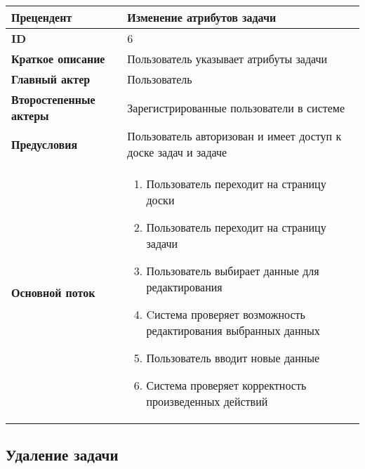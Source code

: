 \documentclass[14pt,a4paper]{extarticle}
\begin{document}
\begin{tabular}{|l|p{9cm}|}
	\hline
	\textbf{Прецендент}            & Изменение атрибутов задачи                                         \\
	\hline
	\textbf{ID}                    & 6                                                                  \\
	\hline
	\textbf{Краткое описание}      & Пользователь указывает атрибуты задачи                             \\
	\hline
	\textbf{Главный актер}         & Пользователь                                                       \\
	\hline
	\textbf{Второстепенные актеры} & Зарегистрированные пользователи в системе                          \\
	\hline
	\textbf{Предусловия}           & Пользователь авторизован и имеет доступ к доске задач и задаче     \\
	\hline
	\textbf{Основной поток}        & \begin{enumerate}
		                                 \item Пользователь переходит на страницу доски
		                                 \item Пользователь переходит на страницу задачи
		                                 \item Пользователь выбирает данные для редактирования
		                                 \item Cистема проверяет возможность редактирования выбранных данных
		                                 \item Пользователь вводит новые данные
		                                 \item Система проверяет корректность произведенных действий
	                                 \end{enumerate} \\
	\hline
\end{tabular}

\subsection{Удаление задачи}
\end{document}
